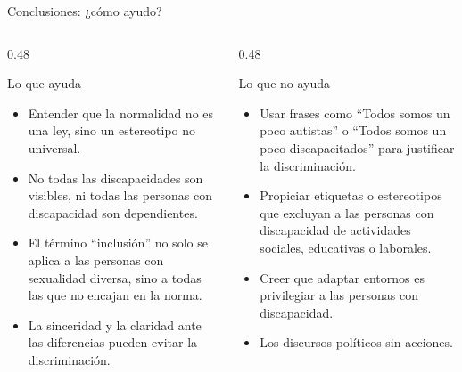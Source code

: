 \begin{frame}{Conclusiones: ¿cómo ayudo?}
  \begin{columns}[T]
    \begin{column}{0.48\textwidth}
      \begin{block}{Lo que ayuda}
        \footnotesize
        \begin{itemize}
          \item Entender que la normalidad no es una ley, sino un estereotipo no universal.
          \item No todas las discapacidades son visibles, ni todas las personas con discapacidad son dependientes.
          \item El término \enquote{inclusión} no solo se aplica a las personas con sexualidad diversa, sino a todas las que no encajan en la norma.
          \item La sinceridad y la claridad ante las diferencias pueden evitar la discriminación.
        \end{itemize}
      \end{block}
    \end{column}
    \begin{column}{0.48\textwidth}
      \begin{alertblock}{Lo que no ayuda}
        \footnotesize
        \begin{itemize}
          \item Usar frases como \enquote{Todos somos un poco autistas} o \enquote{Todos somos un poco discapacitados} para justificar la discriminación.
          \item Propiciar etiquetas o estereotipos que excluyan a las personas con discapacidad de actividades sociales, educativas o laborales.
          \item Creer que adaptar entornos es privilegiar a las personas con discapacidad.
          \item Los discursos políticos sin acciones.
        \end{itemize}
      \end{alertblock}
    \end{column}
  \end{columns}
\end{frame}


